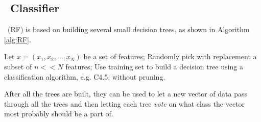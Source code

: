 \subsection{\rf\ Classifier}
\rf\ (RF) is based on building several small decision trees, as shown in Algorithm \ref{alg:RF}.

\begin{algorithm}
\small
\caption{\rf\
    \label{alg:RF}}
\begin{algorithmic}
\State Let $x = (x_1,x_2,...,x_N)$ be a set of features;
	\State Randomly pick with replacement a subset of $n << N$ features;
	\State Use training set to build a decision tree using a classification algorithm, e.g. C4.5, without pruning.
\EndWhile
\end{algorithmic}
\end{algorithm}
After all the trees are built, they can be used to let a new vector of data pass through all the trees and then letting each tree \emph{vote} on what class the vector most probably should be a part of. \cite{RFWeb}